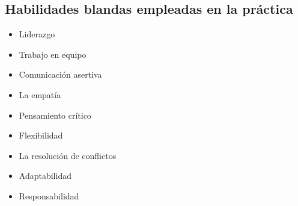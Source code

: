 \documentclass{article}
\begin{document}
\subsection{Habilidades blandas empleadas en la práctica}
\begin{itemize}[leftmargin=1.5em, itemsep=2pt]
    \item[$\blacksquare$] Liderazgo
    \item[$\blacksquare$] Trabajo en equipo
    \item[$\blacksquare$] Comunicación asertiva
    \item[$\square$] La empatía
    \item[$\blacksquare$] Pensamiento crítico
    \item[$\square$] Flexibilidad
    \item[$\square$] La resolución de conflictos
    \item[$\square$] Adaptabilidad
    \item[$\blacksquare$] Responsabilidad
\end{itemize}
\end{document}
